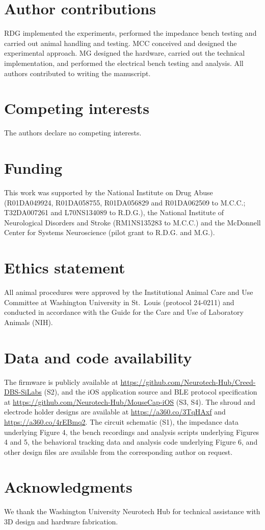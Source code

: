 \section{Author contributions}\label{author-contributions}

RDG implemented the experiments, performed the impedance bench testing and carried out animal handling and testing. MCC conceived and designed the experimental approach. MG designed the hardware, carried out the technical implementation, and performed the electrical bench testing and analysis. All authors contributed to writing the manuscript.

\section{Competing interests}\label{competing-interests}

The authors declare no competing interests.

\section{Funding}\label{funding}

This work was supported by the National Institute on Drug Abuse (R01DA049924, R01DA058755, R01DA056829 and R01DA062509 to M.C.C.; T32DA007261 and L70NS134089 to R.D.G.), the National Institute of Neurological Disorders and Stroke (RM1NS135283 to M.C.C.) and the McDonnell Center for Systems Neuroscience (pilot grant to R.D.G. and M.G.).

\section{Ethics statement}\label{ethics-statement}

All animal procedures were approved by the Institutional Animal Care and Use Committee at Washington University in St.~Louis (protocol 24-0211) and conducted in accordance with the Guide for the Care and Use of Laboratory Animals (NIH).

\section{Data and code availability}\label{data-and-code-availability}

The firmware is publicly available at \url{https://github.com/Neurotech-Hub/Creed-DBS-SiLabs} (S2), and the iOS application source and BLE protocol specification at \url{https://github.com/Neurotech-Hub/MouseCap-iOS} (S3, S4). The shroud and electrode holder designs are available at \url{https://a360.co/3TqHAxf} and \url{https://a360.co/4rEBmq2}. The circuit schematic (S1), the impedance data underlying Figure 4, the bench recordings and analysis scripts underlying Figures 4 and 5, the behavioral tracking data and analysis code underlying Figure 6, and other design files are available from the corresponding author on request.

\section{Acknowledgments}\label{acknowledgments}

We thank the Washington University Neurotech Hub for technical assistance with 3D design and hardware fabrication.
